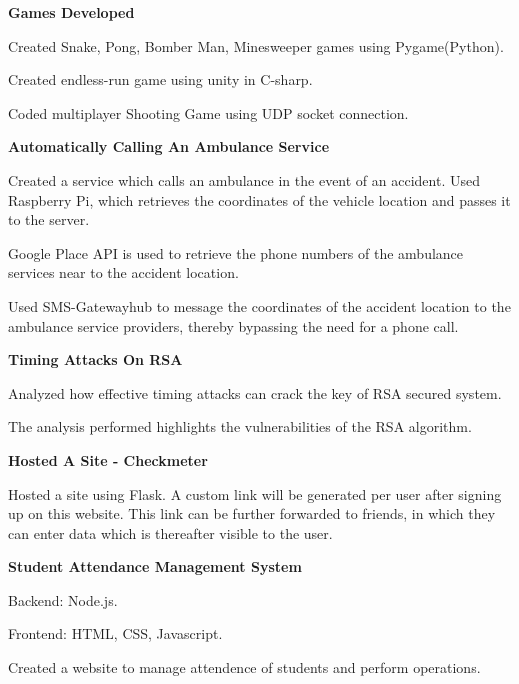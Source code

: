 \begin{cventries}
  \cventry
    { \textbf{Games Developed} }{}{}{}
    {
      \begin{cvitems}
        \item {Created Snake, Pong, Bomber Man, Minesweeper games using Pygame(Python).}
        \item {Created endless-run game using unity in C-sharp.}
        \item {Coded multiplayer Shooting Game using UDP socket connection.}
      \end{cvitems}
    }
  \cventry
    { \textbf{ Automatically Calling An Ambulance Service } }{}{}{}
    {
      \begin{cvitems}
        \item {Created a service which calls an ambulance in the event of an accident. Used Raspberry Pi, which retrieves the coordinates of the vehicle location and passes it to the server.}
        \item {Google Place API is used to retrieve the phone numbers of the ambulance services near to the accident location.}
        \item {Used SMS-Gatewayhub to message the coordinates of the accident location to the ambulance service providers, thereby bypassing the need for a phone call.}
      \end{cvitems}
    }
  \cventry
    {\textbf{Timing Attacks On RSA}}{}{}{}
    {
      \begin{cvitems}
        \item {Analyzed how effective timing attacks can crack the key of RSA secured system.}
        \item {The analysis performed highlights the vulnerabilities of the RSA algorithm.}
      \end{cvitems}
    }
  \cventry
    { \textbf{ Hosted A Site - Checkmeter } }{}{}{}
    {
      \begin{cvitems}
        \item {Hosted a site using Flask. A custom link will be generated per user after signing up on this website. This link can be further forwarded to friends, in which they can enter data which is thereafter visible to the user.}
      \end{cvitems}
    }
  \cventry
    { \textbf{ Student Attendance Management System } }{}{}{}
    {
      \begin{cvitems}
        \item {Backend: Node.js.}
        \item {Frontend: HTML, CSS, Javascript.}
        \item {Created a website to manage attendence of students and perform operations.}
      \end{cvitems}
    }
  
\end{cventries}